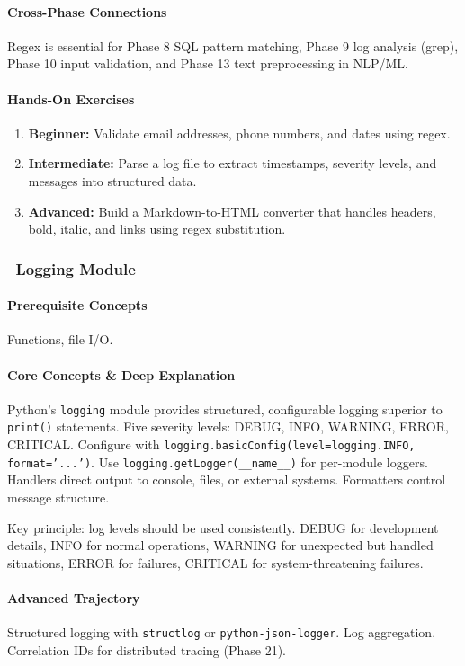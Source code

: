 \documentclass[11pt, a4paper, oneside]{report}
\newcommand{\mustmaster}[1]{\subsubsection{\texorpdfstring{\fcolorbox{blue!40!black}{blue!8}{\footnotesize\bfseries\color{blue!40!black} MUST MASTER}~#1}{#1}}}
\begin{document}
\paragraph{Cross-Phase Connections} Regex is essential for Phase 8 SQL pattern matching, Phase 9 log analysis (grep), Phase 10 input validation, and Phase 13 text preprocessing in NLP/ML.

\paragraph{Hands-On Exercises}
\begin{enumerate}[leftmargin=*]
\item \textbf{Beginner:} Validate email addresses, phone numbers, and dates using regex.
\item \textbf{Intermediate:} Parse a log file to extract timestamps, severity levels, and messages into structured data.
\item \textbf{Advanced:} Build a Markdown-to-HTML converter that handles headers, bold, italic, and links using regex substitution.
\end{enumerate}

\mustmaster{Logging Module}

\paragraph{Prerequisite Concepts} Functions, file I/O.

\paragraph{Core Concepts \& Deep Explanation} Python's \texttt{logging} module provides structured, configurable logging superior to \texttt{print()} statements. Five severity levels: DEBUG, INFO, WARNING, ERROR, CRITICAL. Configure with \texttt{logging.basicConfig(level=logging.INFO, format='...')}. Use \texttt{logging.getLogger(\_\_name\_\_)} for per-module loggers. Handlers direct output to console, files, or external systems. Formatters control message structure.

Key principle: log levels should be used consistently. DEBUG for development details, INFO for normal operations, WARNING for unexpected but handled situations, ERROR for failures, CRITICAL for system-threatening failures.

\paragraph{Advanced Trajectory} Structured logging with \texttt{structlog} or \texttt{python-json-logger}. Log aggregation. Correlation IDs for distributed tracing (Phase 21).
\end{document}
